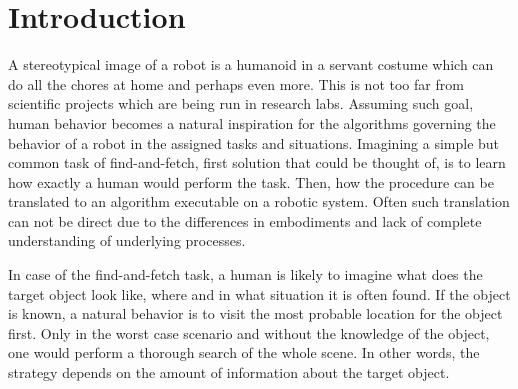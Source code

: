 ﻿%
\chapter{Introduction}
\label{Introduction.ch}
A stereotypical image of a robot is a humanoid in a servant costume which can do all the chores at home and perhaps even more. 
This is not too far from scientific projects which are being run in research labs. 
Assuming such goal, human behavior becomes a natural inspiration for the algorithms governing the behavior of a robot in the 
assigned tasks and situations.
Imagining a simple but common task of find-and-fetch, first solution that could be thought of, is to learn how exactly a human 
would perform the task. 
Then, how the procedure can be translated to an algorithm executable on a robotic system.
Often such translation can not be direct due to the differences in embodiments and lack of complete understanding of underlying 
processes. 

In case of the find-and-fetch task, a human is likely to imagine what does the target object look like, where and 
in what situation it is often found.
If the object is known, a natural behavior is to visit the most probable location for the object first.
Only in the worst case scenario and without the knowledge of the object, one would perform a thorough search of the whole scene.
In other words, the strategy depends on the amount of information about the target object. 

